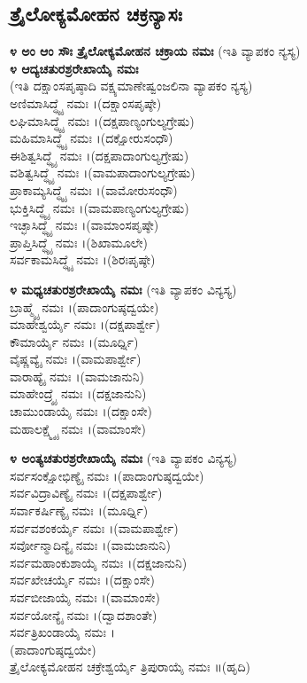 \subsection{ ತ್ರೈಲೋಕ್ಯಮೋಹನ ಚಕ್ರನ್ಯಾಸಃ}
{\bfseries ೪ ಅಂ ಆಂ ಸೌಃ ತ್ರೈಲೋಕ್ಯಮೋಹನ ಚಕ್ರಾಯ ನಮಃ }(ಇತಿ ವ್ಯಾಪಕಂ ನ್ಯಸ್ಯ)\\
{\bfseries ೪ ಆದ್ಯಚತುರಶ್ರರೇಖಾಯೈ ನಮಃ }\\(ಇತಿ ದಕ್ಷಾಂಸಪೃಷ್ಠಾದಿ ವಕ್ಷ್ಯಮಾಣೇಷ್ವಂಜಲಿನಾ ವ್ಯಾಪಕಂ ನ್ಯಸ್ಯ)\\
 ಅಣಿಮಾಸಿದ್ಧ್ಯೈ ನಮಃ ।(ದಕ್ಷಾಂಸಪೃಷ್ಠೇ)\\
 ಲಘಿಮಾಸಿದ್ಧ್ಯೈ ನಮಃ ।(ದಕ್ಷಪಾಣ್ಯಂಗುಲ್ಯಗ್ರೇಷು)\\
 ಮಹಿಮಾಸಿದ್ಧ್ಯೈ ನಮಃ ।(ದಕ್ಷೋರುಸಂಧೌ)\\
 ಈಶಿತ್ವಸಿದ್ಧ್ಯೈ ನಮಃ ।(ದಕ್ಷಪಾದಾಂಗುಲ್ಯಗ್ರೇಷು)\\
 ವಶಿತ್ವಸಿದ್ಧ್ಯೈ ನಮಃ ।(ವಾಮಪಾದಾಂಗುಲ್ಯಗ್ರೇಷು)\\
 ಪ್ರಾಕಾಮ್ಯಸಿದ್ಧ್ಯೈ ನಮಃ ।(ವಾಮೋರುಸಂಧೌ)\\
 ಭುಕ್ತಿಸಿದ್ಧ್ಯೈ ನಮಃ ।(ವಾಮಪಾಣ್ಯಂಗುಲ್ಯಗ್ರೇಷು)\\
 ಇಚ್ಛಾಸಿದ್ಧ್ಯೈ ನಮಃ ।(ವಾಮಾಂಸಪೃಷ್ಠೇ)\\
 ಪ್ರಾಪ್ತಿಸಿದ್ಧ್ಯೈ ನಮಃ ।(ಶಿಖಾಮೂಲೇ)\\
 ಸರ್ವಕಾಮಸಿದ್ಧ್ಯೈ ನಮಃ ।(ಶಿರಃಪೃಷ್ಠೇ)

{\bfseries ೪ ಮಧ್ಯಚತುರಶ್ರರೇಖಾಯೈ ನಮಃ }(ಇತಿ ವ್ಯಾಪಕಂ ವಿನ್ಯಸ್ಯ)\\
 ಬ್ರಾಹ್ಮ್ಯೈ ನಮಃ ।(ಪಾದಾಂಗುಷ್ಠದ್ವಯೇ)\\
 ಮಾಹೇಶ್ವರ್ಯೈ ನಮಃ ।(ದಕ್ಷಪಾರ್ಶ್ವೇ)\\
 ಕೌಮಾರ್ಯೈ ನಮಃ ।(ಮೂರ್ಧ್ನಿ)\\
 ವೈಷ್ಣವ್ಯೈ ನಮಃ ।(ವಾಮಪಾರ್ಶ್ವೇ)\\
 ವಾರಾಹ್ಯೈ ನಮಃ ।(ವಾಮಜಾನುನಿ)\\
 ಮಾಹೇಂದ್ರ್ಯೈ ನಮಃ ।(ದಕ್ಷಜಾನುನಿ)\\
 ಚಾಮುಂಡಾಯೈ ನಮಃ ।(ದಕ್ಷಾಂಸೇ)\\
 ಮಹಾಲಕ್ಷ್ಮ್ಯೈ ನಮಃ ।(ವಾಮಾಂಸೇ)

{\bfseries ೪ ಅಂತ್ಯಚತುರಶ್ರರೇಖಾಯೈ ನಮಃ }(ಇತಿ ವ್ಯಾಪಕಂ ವಿನ್ಯಸ್ಯ)\\
 ಸರ್ವಸಂಕ್ಷೋಭಿಣ್ಯೈ ನಮಃ ।(ಪಾದಾಂಗುಷ್ಠದ್ವಯೇ)\\
 ಸರ್ವವಿದ್ರಾವಿಣ್ಯೈ ನಮಃ ।(ದಕ್ಷಪಾರ್ಶ್ವೇ)\\
 ಸರ್ವಾಕರ್ಷಿಣ್ಯೈ ನಮಃ ।(ಮೂರ್ಧ್ನಿ)\\
 ಸರ್ವವಶಂಕರ್ಯೈ ನಮಃ ।(ವಾಮಪಾರ್ಶ್ವೇ)\\
 ಸರ್ವೋನ್ಮಾದಿನ್ಯೈ ನಮಃ ।(ವಾಮಜಾನುನಿ)\\
 ಸರ್ವಮಹಾಂಕುಶಾಯೈ ನಮಃ ।(ದಕ್ಷಜಾನುನಿ)\\
 ಸರ್ವಖೇಚರ್ಯೈ ನಮಃ ।(ದಕ್ಷಾಂಸೇ)\\
 ಸರ್ವಬೀಜಾಯೈ ನಮಃ ।(ವಾಮಾಂಸೇ)\\
 ಸರ್ವಯೋನ್ಯೈ ನಮಃ ।(ದ್ವಾದಶಾಂತೇ)\\
 ಸರ್ವತ್ರಿಖಂಡಾಯೈ ನಮಃ ।\\(ಪಾದಾಂಗುಷ್ಠದ್ವಯೇ)\\
 ತ್ರೈಲೋಕ್ಯಮೋಹನ ಚಕ್ರೇಶ್ವರ್ಯೈ ತ್ರಿಪುರಾಯೈ ನಮಃ ॥(ಹೃದಿ)

